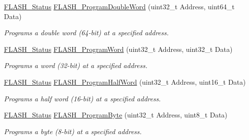 \begin{DoxyCompactItemize}
\hyperlink{group___f_l_a_s_h_gadc63a6f3404ff1f71229a66915e9cdc0}{F\-L\-A\-S\-H\-\_\-\-Status} \hyperlink{group___f_l_a_s_h___group2_gab84b52121e58d0dbc8ff2a92145d20f2}{F\-L\-A\-S\-H\-\_\-\-Program\-Double\-Word} (uint32\-\_\-t Address, uint64\-\_\-t Data)
\begin{DoxyCompactList}\small\item\em Programs a double word (64-\/bit) at a specified address. \end{DoxyCompactList}\item 
\hyperlink{group___f_l_a_s_h_gadc63a6f3404ff1f71229a66915e9cdc0}{F\-L\-A\-S\-H\-\_\-\-Status} \hyperlink{group___f_l_a_s_h___group2_gaac9a2f400b92537bd42a6bd7cc237b11}{F\-L\-A\-S\-H\-\_\-\-Program\-Word} (uint32\-\_\-t Address, uint32\-\_\-t Data)
\begin{DoxyCompactList}\small\item\em Programs a word (32-\/bit) at a specified address. \end{DoxyCompactList}\item 
\hyperlink{group___f_l_a_s_h_gadc63a6f3404ff1f71229a66915e9cdc0}{F\-L\-A\-S\-H\-\_\-\-Status} \hyperlink{group___f_l_a_s_h___group2_ga5c1336f667950a8765887228f1d0d501}{F\-L\-A\-S\-H\-\_\-\-Program\-Half\-Word} (uint32\-\_\-t Address, uint16\-\_\-t Data)
\begin{DoxyCompactList}\small\item\em Programs a half word (16-\/bit) at a specified address. \end{DoxyCompactList}\item 
\hyperlink{group___f_l_a_s_h_gadc63a6f3404ff1f71229a66915e9cdc0}{F\-L\-A\-S\-H\-\_\-\-Status} \hyperlink{group___f_l_a_s_h___group2_gac425adf52fe7f229ef6bb893fe386848}{F\-L\-A\-S\-H\-\_\-\-Program\-Byte} (uint32\-\_\-t Address, uint8\-\_\-t Data)
\begin{DoxyCompactList}\small\item\em Programs a byte (8-\/bit) at a specified address. \end{DoxyCompactList}\end{DoxyCompactItemize}


